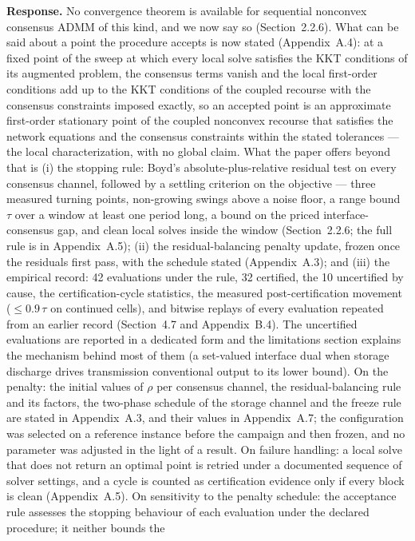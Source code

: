 \documentclass[11pt]{article}
\newcommand{\rresponse}[1]{\noindent\textbf{Response.} #1\par\smallskip}
\begin{document}
\rresponse{No convergence theorem is available for sequential nonconvex consensus ADMM of this kind, and we
now say so (Section~2.2.6). What can be said about a point the procedure accepts is now stated (Appendix~A.4): at a fixed point of the sweep at which every local solve satisfies the KKT conditions of its augmented problem, the consensus terms vanish and the local first-order conditions add up to the KKT conditions of the coupled recourse with the consensus constraints imposed exactly, so an accepted point is an approximate first-order stationary point of the coupled nonconvex recourse that satisfies the network equations and the consensus constraints within the stated tolerances --- the local characterization, with no global claim. What the paper offers beyond that is (i) the stopping rule: Boyd's absolute-plus-relative
residual test on every consensus channel, followed by a settling criterion on the objective --- three
measured turning points, non-growing swings above a noise floor, a range bound $\tau$ over a window at
least one period long, a bound on the priced interface-consensus gap, and clean local solves inside the
window (Section~2.2.6; the full rule is in Appendix~A.5); (ii) the residual-balancing penalty update, frozen once the residuals first pass,
with the schedule stated (Appendix~A.3); and (iii) the empirical record: 42 evaluations under the rule, 32
certified, the 10 uncertified by cause, the certification-cycle statistics, the measured
post-certification movement ($\le 0.9\,\tau$ on continued cells), and bitwise replays of every evaluation
repeated from an earlier record (Section~4.7 and Appendix~B.4). The uncertified evaluations are reported in a dedicated form and
the limitations section explains the mechanism behind most of them (a set-valued interface dual when
storage discharge drives transmission conventional output to its lower bound). On the penalty: the
initial values of $\rho$ per consensus channel, the residual-balancing rule and its factors, the two-phase
schedule of the storage channel and the freeze rule are stated in Appendix~A.3, and their values in Appendix~A.7; the configuration was
selected on a reference instance before the campaign and then frozen, and no parameter was adjusted in
the light of a result. On failure handling: a local solve that does not return an optimal point is retried
under a documented sequence of solver settings, and a cycle is counted as certification evidence only if
every block is clean (Appendix~A.5). On sensitivity to the penalty schedule: the acceptance rule assesses the stopping behaviour of each evaluation under the declared procedure; it neither bounds the
}
\end{document}
